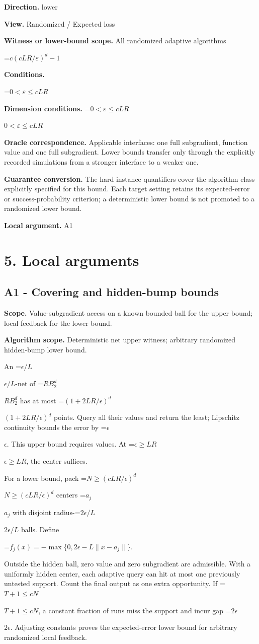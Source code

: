 \documentclass[10pt,a4paper]{article}
\newcommand{\AtlasMath}[1]{\par\begingroup\centering\setbox0=\hbox{$\displaystyle #1$}\ifdim\wd0>1.4\linewidth\typeout{ATLAS WIDE FORMULA: \the\wd0}\fi\ifdim\wd0>\linewidth\resizebox{\linewidth}{!}{\box0}\else\box0\fi\par\endgroup}
\newcommand{\AtlasInlineMath}[1]{\begingroup\setbox0=\hbox{$#1$}\ifdim\wd0>.4\linewidth\endgroup\AtlasMath{#1}\else\endgroup$#1$\fi}
\begin{document}
\textbf{Direction.} lower

\textbf{View.} Randomized / Expected loss

\textbf{Witness or lower-bound scope.} All randomized adaptive algorithms

\AtlasMath{c(cLR/\varepsilon)^d-1}
\textbf{Conditions.} 
\AtlasMath{0<\varepsilon\le cLR}


\textbf{Dimension conditions.} \AtlasInlineMath{0<\varepsilon\le cLR}

\textbf{Oracle correspondence.} Applicable interfaces: one full subgradient, function value and one full subgradient. Lower bounds transfer only through the explicitly recorded simulations from a stronger interface to a weaker one.

\textbf{Guarantee conversion.} The hard-instance quantifiers cover the algorithm class explicitly specified for this bound. Each target setting retains its expected-error or success-probability criterion; a deterministic lower bound is not promoted to a randomized lower bound.

\textbf{Local argument.} A1

\section{5. Local arguments}
\subsection{A1 - Covering and hidden-bump bounds}
\textbf{Scope.} Value-subgradient access on a known bounded ball for the upper bound; local feedback for the lower bound.

\textbf{Algorithm scope.} Deterministic net upper witness; arbitrary randomized hidden-bump lower bound.

An \AtlasInlineMath{\epsilon/L}-net of \AtlasInlineMath{RB_2^d} has at most \AtlasInlineMath{(1+2LR/\epsilon)^d} points. Query all their values and return the least; Lipschitz continuity bounds the error by \AtlasInlineMath{\epsilon}. This upper bound requires values. At \AtlasInlineMath{\epsilon\ge LR}, the center suffices.

For a lower bound, pack \AtlasInlineMath{N\ge(cLR/\epsilon)^d} centers \AtlasInlineMath{a_j} with disjoint radius-\AtlasInlineMath{2\epsilon/L} balls. Define

\AtlasMath{f_j(x)=-\max\{0,2\epsilon-L\|x-a_j\|\}.}

Outside the hidden ball, zero value and zero subgradient are admissible. With a uniformly hidden center, each adaptive query can hit at most one previously untested support. Count the final output as one extra opportunity. If \AtlasInlineMath{T+1\le cN}, a constant fraction of runs miss the support and incur gap \AtlasInlineMath{2\epsilon}. Adjusting constants proves the expected-error lower bound for arbitrary randomized local feedback.
\end{document}
